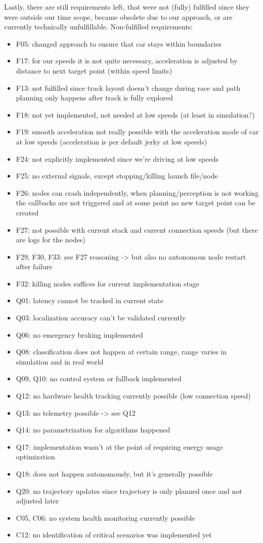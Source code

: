 Lastly, there are still requirements left, that were not (fully) fulfilled since they were outside our time scope, became obsolete due to our approach, or are currently technically unfulfillable. 
Non-fulfilled requirements:
\begin{itemize}
	\item F05: changed approach to ensure that car stays within boundaries
	\item F17: for our speeds it is not quite necessary, acceleration is adjusted by distance to next target point (within speed limits)
	\item F13: not fulfilled since track layout doesn't change during race and path planning only happens after track is fully explored
	\item F18: not yet implemented, not needed at low speeds (at least in simulation?)
	\item F19: smooth acceleration not really possible with the acceleration mode of car at low speeds (acceleration is per default jerky at low speeds)
	\item F24: not explicitly implemented since we're driving at low speeds
	\item F25: no external signals, except stopping/killing launch file/node
	\item F26: nodes can crash independently, when planning/perception is not working the callbacks are not triggered and at some point no new target point can be created
	\item F27: not possible with current stack and current connection speeds (but there are logs for the nodes)
	\item F29, F30, F33: see F27 reasoning -> but also no autonomous node restart after failure
	\item F32: killing nodes suffices for current implementation stage
	\item Q01: latency cannot be tracked in current state
	\item Q03: localization accuracy can't be validated currently
	\item Q06: no emergency braking implemented
	\item Q08: classification does not happen at certain range, range varies in simulation and in real world
	\item Q09, Q10: no control system or fallback implemented
	\item Q12: no hardware health tracking currently possible (low connection speed)
	\item Q13: no telemetry possible -> see Q12
	\item Q14: no parametrization for algorithms happened
	\item Q17: implementation wasn't at the point of requiring energy usage optimization
	\item Q18: does not happen autonomously, but it's generally possible
	\item Q20: no trajectory updates since trajectory is only planned once and not adjusted later
	\item C05, C06: no system health monitoring currently possible
	\item C12: no identification of critical scenarios was implemented yet
\end{itemize}
